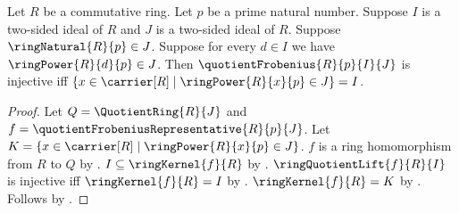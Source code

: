 \begin{theorem}\label{quotient_frobenius_injective_iff_kernel}
    Let $R$ be a commutative ring.
    Let $p$ be a prime natural number.
    Suppose $I$ is a two-sided ideal of $R$ and
        $J$ is a two-sided ideal of $R$.
    Suppose $\ringNatural{R}{p}\in J$.
    Suppose for every $d\in I$ we have
        $\ringPower{R}{d}{p}\in J$.
    Then $\quotientFrobenius{R}{p}{I}{J}$ is injective iff
        $\{x\in\carrier[R]\mid\ringPower{R}{x}{p}\in J\}=I$.
\end{theorem}
\begin{proof}
    Let $Q=\QuotientRing{R}{J}$ and
        $f=\quotientFrobeniusRepresentative{R}{p}{J}$.
    Let $K=\{x\in\carrier[R]\mid\ringPower{R}{x}{p}\in J\}$.
    $f$ is a ring homomorphism from $R$ to $Q$ by
        .
    $I\subseteq\ringKernel{f}{R}$ by
        .
    $\ringQuotientLift{f}{R}{I}$ is injective iff
        $\ringKernel{f}{R}=I$ by
        .
    $\ringKernel{f}{R}=K$ by
        .
    Follows by .
\end{proof}

